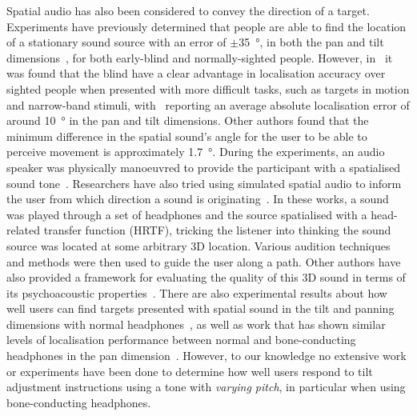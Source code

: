 \documentclass[sigconf, review=true, screen=true, anonymous=true]{acmart}
\begin{document}
Spatial audio has also been considered to convey the direction of a target.
Experiments have previously determined that people are able to find the location of a stationary sound source with an error of $\pm$\SI{35}{\degree}, in both the pan and tilt dimensions~\cite{zwiers2001spatial}, for both early-blind and normally-sighted people.
However, in~\cite{lewald2013exceptional, lessard1998early} it was found that the blind have a clear advantage in localisation accuracy over sighted people when presented with more difficult tasks, such as targets in motion and narrow-band stimuli, with~\cite{lewald2013exceptional} reporting an average absolute localisation error of around \SI{10}{\degree} in the pan and tilt dimensions.
Other authors found that the minimum difference in the spatial sound's angle for the user to be able to perceive movement is approximately \SI{1.7}{\degree}. During the experiments, an audio speaker was physically manoeuvred to provide the participant with a spatialised sound tone~\cite{ashmead1998spatial}.
Researchers have also tried using simulated spatial audio to inform the user from which direction a sound is originating~\cite{holland2002audiogps, kammoun2012navigation, rebillat2009smart, menelas2010audio, wilson2007swan, zotkin2004rendering}.
In these works, a sound was played through a set of headphones and the source spatialised with a head-related transfer function (HRTF), tricking the listener into thinking the sound source was located at some arbitrary 3D location.
Various audition techniques and methods were then used to guide the user along a path.
Other authors have also provided a framework for evaluating the quality of this 3D sound in terms of its psychoacoustic properties~\cite{guastavino2004perceptual, nicol2014roadmap}.
There are also experimental results about how well users can find targets presented with spatial sound in the tilt and panning dimensions with normal headphones~\cite{katz2011spatial, zwiers2001spatial}, as well as work that has shown similar levels of localisation performance between normal and bone-conducting headphones in the pan dimension~\cite{macdonald2006spatial}.
However, to our knowledge no extensive work or experiments have been done to determine how well users respond to tilt adjustment instructions using a tone with \emph{varying pitch}, in particular when using bone-conducting headphones. 
\end{document}
